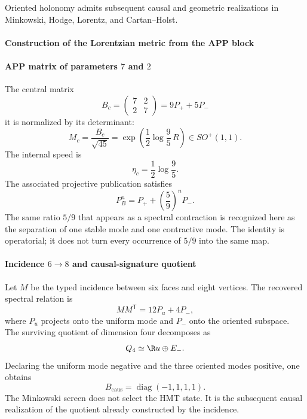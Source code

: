 \noindent Oriented holonomy admits subsequent causal and geometric realizations in Minkowski, Hodge, Lorentz, and Cartan--Holst.\par\medskip

\paragraph{Construction of the Lorentzian metric from the APP block}

\paragraph{APP matrix of parameters \(7\) and \(2\)}

The central matrix
\begin{equation}
B_c=\begin{pmatrix}7&2\\2&7\end{pmatrix}
=9P_++5P_-
\label{eq:Bc}
\end{equation}
it is normalized by its determinant:
\begin{equation}
M_c=\frac{B_c}{\sqrt{45}}
=\exp\left(\frac12\log\frac95\,R\right)
\in SO^+(1,1).
\label{eq:Mc}
\end{equation}
The internal speed is
\[
\eta_c=\frac12\log\frac95.
\]
The associated projective publication satisfies
\begin{equation}
P_B^n=P_++\left(\frac59\right)^nP_-.
\label{eq:PB-contract}
\end{equation}
The same ratio \(5/9\) that appears as a spectral contraction is recognized here
as the separation of one stable mode and one contractive mode. The identity is
operatorial; it does not turn every occurrence of \(5/9\) into the same map.

\paragraph{Incidence \(6\to8\) and causal-signature quotient}

Let \(M\) be the typed incidence between six faces and eight
vertices. The recovered spectral relation is
\begin{equation}
MM^{\mathsf T}=12P_u+4P_-,
\label{eq:MMt}
\end{equation}
where \(P_u\) projects onto the uniform mode and \(P_-\) onto the
oriented subspace. The surviving quotient of dimension four decomposes as
\begin{equation}
Q_4\simeq\R u\oplus E_-.
\label{eq:radion-Q4}
\end{equation}
Declaring the uniform mode negative and the three oriented modes positive,
one obtains
\begin{equation}
B_{\mathrm{caus}}=\operatorname{diag}(-1,1,1,1).
\label{eq:minkowski}
\end{equation}
The Minkowski screen does not select the HMT state. It is the subsequent causal realization of the quotient already constructed by the incidence.

